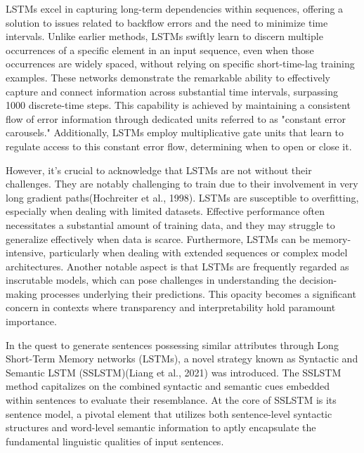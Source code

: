 \documentclass[fleqn,10pt]{thescipub} %
\begin{document}
LSTMs excel in capturing long-term dependencies within sequences, offering a solution to issues related to backflow errors and the need to minimize time intervals. Unlike earlier methods, LSTMs swiftly learn to discern multiple occurrences of a specific element in an input sequence, even when those occurrences are widely spaced, without relying on specific short-time-lag training examples. These networks demonstrate the remarkable ability to effectively capture and connect information across substantial time intervals, surpassing 1000 discrete-time steps. This capability is achieved by maintaining a consistent flow of error information through dedicated units referred to as "constant error carousels." Additionally, LSTMs employ multiplicative gate units that learn to regulate access to this constant error flow, determining when to open or close it.

However, it's crucial to acknowledge that LSTMs are not without their challenges. They are notably challenging to train due to their involvement in very long gradient paths(Hochreiter et al., 1998). LSTMs are susceptible to overfitting, especially when dealing with limited datasets. Effective performance often necessitates a substantial amount of training data, and they may struggle to generalize effectively when data is scarce. Furthermore, LSTMs can be memory-intensive, particularly when dealing with extended sequences or complex model architectures. Another notable aspect is that LSTMs are frequently regarded as inscrutable models, which can pose challenges in understanding the decision-making processes underlying their predictions. This opacity becomes a significant concern in contexts where transparency and interpretability hold paramount importance.



In the quest to generate sentences possessing similar attributes through Long Short-Term Memory networks (LSTMs), a novel strategy known as Syntactic and Semantic LSTM (SSLSTM)(Liang et al., 2021) was introduced. The SSLSTM method capitalizes on the combined syntactic and semantic cues embedded within sentences to evaluate their resemblance. At the core of SSLSTM is its sentence model, a pivotal element that utilizes both sentence-level syntactic structures and word-level semantic information to aptly encapsulate the fundamental linguistic qualities of input sentences.
\end{document}
